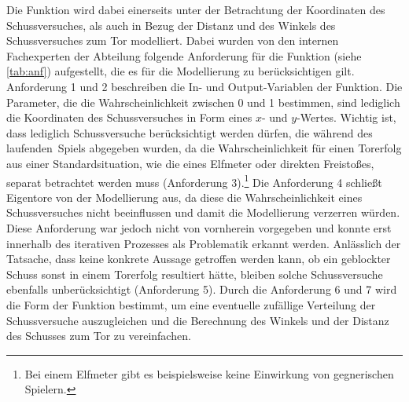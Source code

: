 Die Funktion wird dabei einerseits unter der Betrachtung der Koordinaten des Schussversuches, als auch in Bezug der Distanz und des Winkels des Schussversuches zum Tor modelliert. Dabei wurden von den internen Fachexperten der Abteilung folgende Anforderung für die Funktion (siehe \vref{tab:anf}) aufgestellt, die es für die Modellierung zu berücksichtigen gilt. Anforderung \textsf{1} und \textsf{2} beschreiben die In- und Output-Variablen der Funktion. Die Parameter, die die Wahrscheinlichkeit zwischen 0 und 1 bestimmen, sind lediglich die Koordinaten des Schussversuches in Form eines $x$- und $y$-Wertes. Wichtig ist, dass lediglich Schussversuche berücksichtigt werden dürfen, die während des \glqq laufenden\grqq~Spiels abgegeben wurden, da die Wahrscheinlichkeit für einen Torerfolg aus einer Standardsituation, wie die eines Elfmeter oder direkten Freistoßes, separat betrachtet werden muss (Anforderung \textsf{3}).\footnote{Bei einem Elfmeter gibt es beispielsweise keine Einwirkung von gegnerischen Spielern.} Die Anforderung \textsf{4} schließt Eigentore von der Modellierung aus, da diese die Wahrscheinlichkeit eines Schussversuches nicht beeinflussen und damit die Modellierung verzerren würden. Diese Anforderung war jedoch nicht von vornherein vorgegeben und konnte erst innerhalb des iterativen Prozesses als Problematik erkannt werden. Anlässlich der Tatsache, dass keine konkrete Aussage getroffen werden kann, ob ein geblockter Schuss sonst in einem Torerfolg resultiert hätte, bleiben solche Schussversuche ebenfalls unberücksichtigt (Anforderung \textsf{5}). Durch die Anforderung \textsf{6} und \textsf{7} wird die Form der Funktion bestimmt, um eine eventuelle zufällige Verteilung der Schussversuche auszugleichen und die Berechnung des Winkels und der Distanz des Schusses zum Tor zu vereinfachen.

